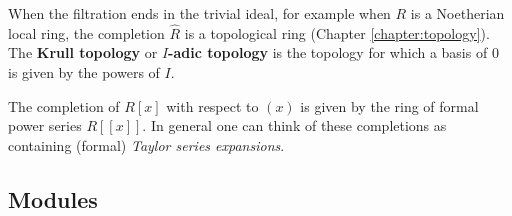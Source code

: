     \begin{property}
        When the filtration ends in the trivial ideal, for example when $R$ is a Noetherian local ring, the completion $\widehat{R}$ is a topological ring (Chapter \ref{chapter:topology}). The \textbf{Krull topology} or \textbf{$I$-adic topology} is the topology for which a basis of $0$ is given by the powers of $I$.
    \end{property}

    \begin{example}
        The completion of $R[x]$ with respect to $(x)$ is given by the ring of formal power series $R[[x]]$. In general one can think of these completions as containing (formal) \textit{Taylor series expansions}.
    \end{example}

\subsection{Modules}

